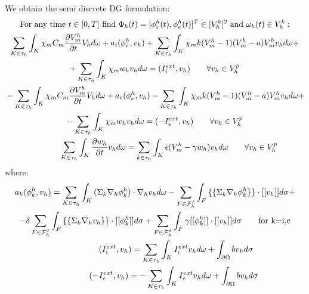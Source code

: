 \documentclass[a4paper,12pt]{article}
\begin{document}
    We obtain the semi discrete DG formulation:
    \begin{equation*}
    \begin{gathered}
    \text{For any time } t \in [0,T] \text{ find } \Phi_h(t)=[\phi_i^h(t),\phi_e^h(t)]^T \in [V_h^k]^2 \text{ and } \omega_h(t) \in V_h^k:\\
    \sum_{K \in \tau_h} \int_K{ \chi_m C_m \pdv{V_m^h}{t} V_h d\omega}+a_i(\phi_i^h,v_h)+\sum_{K \in \tau_h} \int_K{ \chi_m k (V_m^h-1)(V_m^h-a) V_m^h v_h d\omega}+\\
    +\sum_{K \in \tau_h} \int_K{ \chi_m w_h v_h d\omega}=(I_i^{ext},v_h) \qquad \forall v_h \in V_h^p\\
    \newline
    -\sum_{K \in \tau_h} \int_K{ \chi_m C_m \pdv{V_m^h}{t} V_h d\omega}+a_e(\phi_e^h,v_h)-\sum_{K \in \tau_h} \int_K{ \chi_m k (V_m^h-1)(V_m^h-a) V_m^h v_h d\omega}+\\
    -\sum_{K \in \tau_h} \int_K{ \chi_m w_h v_h d\omega}=(-I_e^{ext},v_h) \qquad \forall v_h \in V_h^p\\
    \newline
    \sum_{K \in \tau_h} \int_K{\pdv{w_h}{t}v_h d\omega}=\sum_{k \in \tau_h} \int_K{\epsilon (V_m^h-\gamma w_h) v_h d\omega} \qquad \forall v_h \in V_h^p\\
    \end{gathered}
    \end{equation*}
    where:
    \begin{equation*}
    \begin{gathered}
    a_k(\phi_k^h,v_h)=\sum_{K \in \tau_h} \int_K{(\Sigma_k \nabla_h \phi_k^h) \cdot \nabla_h v_h d\omega}-\sum_{F \in \mathcal{F}_h^I} \int_F { \{\{\Sigma_k \nabla_h \phi_k^h \}\} \cdot [[v_h]] d\sigma}+\\
    -\delta \sum_{F \in \mathcal{F}_h^I} \int_F{ \{\{\Sigma_k \nabla_h v_h\}\} \cdot [[\phi_k^h]]d\sigma}+\sum_{F \in \mathcal{F}_h^I}\int_F {\gamma [[\phi_k^h]] \cdot [[v_h]] d\sigma} \qquad \text{for k=i,e}\\
    \newline
    (I_i^{ext},v_h)=\sum_{K \in \tau_h} \int_K {I_i^{ext} v_h d\omega}+\int_{\partial \Omega}{b v_h d\sigma}\\
    \newline
    (-I_e^{ext},v_h)=-\sum_{K \in \tau_h} \int_K {I_e^{ext} v_h d\omega}+\int_{\partial \Omega}{b v_h d\sigma}
    \end{gathered}
    \end{equation*}
    
\end{document}
